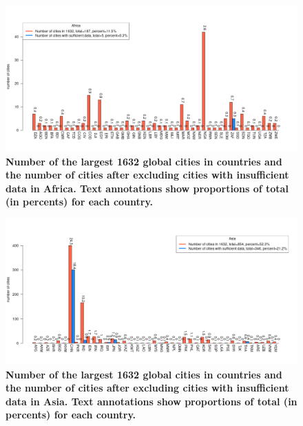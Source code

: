 \documentclass[preprint,10pt]{elsarticle} %
\begin{document}
\begin{figure}
\centering
\includegraphics[trim={ 0 35 25 50 },clip,scale=0.45]{Images2/Africa_cities_Rev2.png}
\caption{\bf Number of the largest 1632 global cities in countries and the number of cities after excluding cities with insufficient data in Africa. Text annotations show proportions of total (in percents) for each country.}
 \label{fig:africa}
\end{figure}

\begin{figure}
\centering
\includegraphics[trim={ 0 35 25 50 },clip,scale=0.45]{Images2/Asia_cities_Rev2.png}
\caption{\bf Number of the largest 1632 global cities in countries and the number of cities after excluding cities with insufficient data in Asia. Text annotations show proportions of total (in percents) for each country.}
 \label{fig:asia}
\end{figure}
\end{document}
